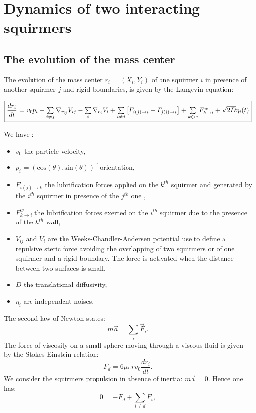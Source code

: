 \documentclass{article}
\begin{document}
\section{Dynamics of two interacting squirmers}
\subsection{The evolution of the mass center}
The evolution of the mass center $r_i$ = $(X_i, Y_i)$ of one squirmer $i$ in presence of 
another squirmer $j$ and rigid boundaries, is given by the Langevin equation:
\begin{center}
$\boxed{\frac{dr_i}{dt}$ = $v_0 p_i -  \sum\limits_{i \ne j}\nabla_{r_{ij}} V_{ij} - \sum\limits_{i}\nabla_{r_i} V_i + \sum\limits_{i\ne j}\left[F_{i(j)\rightarrow i} + F_{j(i)\rightarrow i}\right]+ \sum\limits_{k \in w}F_{k\rightarrow i}^w + \sqrt{2D}\eta_i(t)}$
\end{center}
We have : \begin{itemize}
    \item $v_0$ the particle velocity,
    \item $p_i$ = $(\mathrm{cos}(\theta),\mathrm{sin}(\theta))^T$ orientation,
    \item $F_{i(j)\rightarrow k}$ the lubrification forces applied on the $k^{th}$ squirmer and generated by the $i^{th}$ squirmer in presence of the $j^{th}$ one \cite{Brumley},
    \item $F^w_{k\rightarrow i}$ the lubrification forces exerted on the $i^{th}$ squirmer due to the presence of the $k^{th}$ wall\cite{Brumley},
    \item $V_{ij}$ and $V_i$ are the Weeks-Chandler-Andersen potential use to define a repulsive steric force avoiding 
    the overlapping of two squirmers or of one squirmer and a rigid boundary. 
    The force is activated when the distance between two surfaces is small,
    \item $D$ the translational diffusivity,
    \item $\eta_i$ are independent noises. 
\end{itemize} 
\vspace{0,5cm}
The second law of Newton states\cite{Newton}:
$$m\vec{a} = \sum\limits_i \vec{F}_i.$$
The force of viscosity on a small sphere moving through a viscous fluid is given by the Stokes-Einstein relation\cite{Stokes}:
$$F_d = 6\mu\pi rv_0\frac{dr_i}{dt}.$$
We consider the squirmers propulsion in absence of inertia: $m\vec{a} = 0$. Hence one has:
$$0 = -F_d + \sum\limits_{i \ne d} F_i,$$
\end{document}
